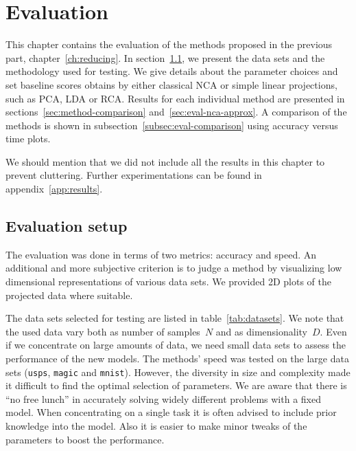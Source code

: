 \chapter{Evaluation}
\label{ch:evaluation}

This chapter contains the evaluation of the methods proposed in the previous part, chapter~\ref{ch:reducing}. In section~\ref{sec:setup}, we present the data sets and the methodology used for testing. We give details about the parameter choices and set baseline scores obtains by either classical NCA or simple linear projections, such as PCA, LDA or RCA. Results for each individual method are presented in sections~\ref{sec:method-comparison} and~\ref{sec:eval-nca-approx}. A comparison of the methods is shown in subsection~\ref{subsec:eval-comparison} using accuracy versus time plots.

We should mention that we did not include all the results in this chapter to prevent cluttering. Further experimentations can be found in appendix~\ref{app:results}.

\section{Evaluation setup}
\label{sec:setup}

The evaluation was done in terms of two metrics: accuracy and speed. An additional and more subjective criterion is to judge a method by visualizing low dimensional representations of various data sets. We provided 2D plots of the projected data where suitable.

The data sets selected for testing are listed in table~\ref{tab:datasets}. We note that the used data vary both as number of samples~$N$ and as dimensionality~$D$. Even if we concentrate on large amounts of data, we need small data sets to assess the performance of the new models. The methods' speed was tested on the large data sets (\texttt{usps}, \texttt{magic} and \texttt{mnist}). However, the diversity in size and complexity made it difficult to find the optimal selection of parameters. We are aware that there is ``no free lunch'' in accurately solving widely different problems with a fixed model. When concentrating on a single task it is often advised to include prior knowledge into the model. Also it is easier to make minor tweaks of the parameters to boost the performance.

